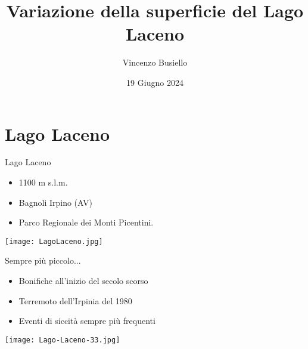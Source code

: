 \documentclass{beamer} %
\title{Variazione della superficie del Lago Laceno}
\author{Vincenzo Busiello}
\date{19 Giugno 2024}
\begin{document}
\maketitle


\section{Lago Laceno}

        \begin{frame}{Lago Laceno}
            \begin{multicols}{2}
                \begin{itemize}
                    \item {\scriptsize 1100 m s.l.m.} 
                    \item {\scriptsize Bagnoli Irpino (AV)}
                    \item {\scriptsize Parco Regionale dei Monti Picentini.}
                \end{itemize}
            \columnbreak
                \begin{center}
                    \texttt{[image: LagoLaceno.jpg]}
                \end{center}
            \end{multicols}
        \end{frame}

        \begin{frame}{Sempre più piccolo...}
            \begin{multicols}{2}
                \begin{itemize}
                    \item {\scriptsize Bonifiche all'inizio del secolo scorso} 
                    \item {\scriptsize Terremoto dell'Irpinia del 1980}
                    \item {\scriptsize Eventi di siccità sempre più frequenti}
                \end{itemize}
            \columnbreak
                \begin{center}
                    \texttt{[image: Lago-Laceno-33.jpg]}
                \end{center}
            \end{multicols}
        \end{frame}
\end{document}
